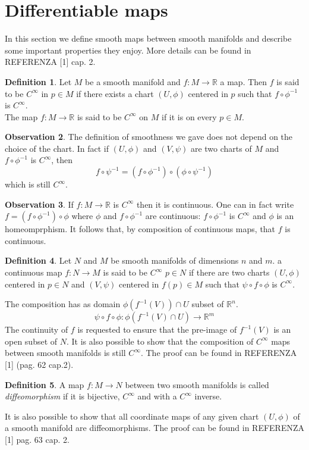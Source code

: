 \documentclass[12pt,a4paper]{report}
\theoremstyle{definition}
\newtheorem{Def}{Definition}[chapter]
\theoremstyle{Theorem}
\theoremstyle{definition}
\theoremstyle{definition}
\newtheorem{Obs}[Def]{Observation}
\begin{document}
		\section{Differentiable maps}
		In this section we define smooth maps between smooth manifolds and describe some important properties they enjoy. More details can be found in REFERENZA [1] cap. 2.
		\begin{Def}
			Let $M$ be a smooth manifold and $f:M\rightarrow\mathbb{R}$ a map. Then $f$ is said to be $C^\infty$ in $p\in M$ if there exists a chart $(U,\phi)$ centered in $p$ such that $f\circ \phi^{-1}$ is $C^\infty$.\\
			The map $f:M\rightarrow \mathbb{R}$ is said to be $C^\infty$ on $M$ if it is on every $p\in M$.
		\end{Def}
		\begin{Obs}
			The definition of smoothness we gave does not depend on the choice of the chart. In fact if $(U,\phi)$ and $(V,\psi)$ are two charts of $M$ and $f\circ\phi^{-1}$ is $C^\infty$, then $$f\circ\psi^{-1}=(f\circ\phi^{-1})\circ(\phi\circ\psi^{-1})$$ which is still $C^\infty$.
		\end{Obs}
		\begin{Obs}
			If $f:M\rightarrow \mathbb{R}$ is $C^\infty$ then it is continuous. One can in fact write $f=(f\circ\phi^{-1})\circ \phi$ where $\phi$ and $f\circ\phi^{-1}$ are continuous: $f\circ\phi^{-1}$ is $C^\infty$ and $\phi$ is an homeomprphism. It follows that, by composition of continuous maps, that $f$ is continuous.\\
		\end{Obs}
		\begin{Def}
			Let $N$ and $M$ be smooth manifolds of dimensions $n$ and $m$. a continuous map $f:N\rightarrow M$ is said to be $C^\infty$  $p\in N$ if there are two charts $(U,\phi)$ centered in $p\in N$ and $(V,\psi)$ centered in $f(p)\in M$ such that $\psi\circ f\circ \phi$ is $C^\infty$.
		\end{Def}
		The composition has as domain $\phi(f^{-1}(V))\cap U$ subset of $\mathbb{R}^n$. $$\psi\circ f\circ \phi:\phi(f^{-1}(V)\cap U)\rightarrow \mathbb{R}^m$$
		The continuity of $f$ is requested to ensure that the pre-image of $f^{-1}(V)$ is an open subset of $N$. It is also possible to show that the composition of $C^\infty$ maps between smooth manifolds is still $C^\infty$. The proof can be found in REFERENZA [1] (pag. 62 cap.2). 
		\begin{Def}
			A map $f:M\rightarrow N$ between two smooth manifolds is called \textit{diffeomorphism} if it is bijective, $C^\infty$ and with a $C^\infty$ inverse.
		\end{Def}
		It is also possible to show that all coordinate maps of any given chart $(U,\phi)$ of a smooth manifold are diffeomorphisms. The proof can be found in REFERENZA [1] pag. 63 cap. 2.
\end{document}
